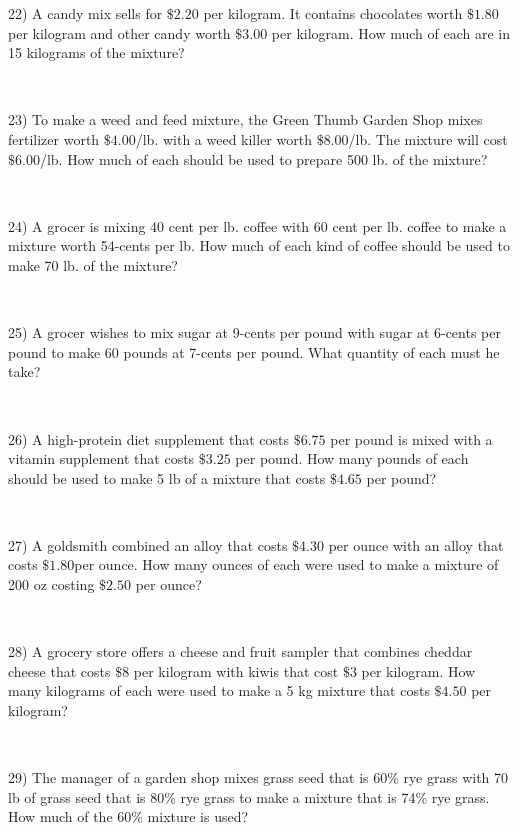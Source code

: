 22) A candy mix sells for $\$2.20$ per kilogram. It contains
chocolates worth $\$1.80$  per kilogram and other candy
worth $\$3.00$ per kilogram. How much of each are in
15 kilograms of the mixture?\par
~\par

23) To make a weed and feed mixture, the Green Thumb Garden Shop mixes fertilizer worth $\$4.00$/lb. with a weed killer
worth $\$8.00$/lb. The mixture will cost
$\$6.00$/lb. How much of each should be used to prepare 500 lb. of the mixture?\par
~\par

24) A grocer is mixing 40 cent per lb. coffee with 60 cent per lb. coffee to
make a mixture worth 54-cents per lb. How much of each kind
of coffee should be used to make 70 lb. of the mixture?\par
~\par

25) A grocer wishes to mix sugar at 9-cents per pound with sugar at 6-cents
per pound to make 60 pounds at 7-cents per pound. What quantity
of each must he take?\par
~\par

26) A high-protein diet supplement that costs $\$6.75$ per pound is
mixed with a vitamin supplement that costs $\$3.25$
per pound. How many pounds of each should be used to make 5
lb of a mixture that costs $\$4.65$ per pound?\par
~\par

27) A goldsmith combined an alloy that costs $\$4.30$ per ounce with
an alloy that costs $\$1.80$per ounce. How many ounces
of each were used to make a mixture of 200 oz costing
$\$2.50$ per ounce?\par
~\par

28) A grocery store offers a cheese and fruit sampler that combines cheddar
cheese that costs $\$8$ per kilogram with kiwis that cost
$\$3$ per kilogram. How many kilograms of each were
used to make a 5 kg mixture that costs $\$4.50$ per kilogram?\par
~\par

29) The manager of a garden shop mixes grass seed that is 60\% rye grass with
70  lb of grass seed that is 80\% rye grass to make a mixture
that is 74\% rye grass. How much of the 60\% mixture
is used?\par
~\par

